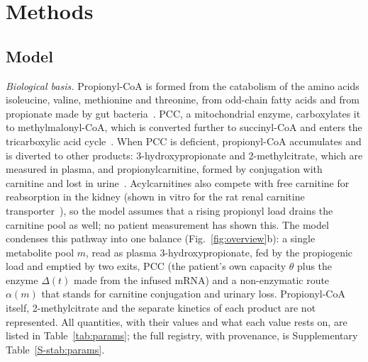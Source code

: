 \documentclass[11pt]{article}
\begin{document}
\section*{Methods}

\subsection*{Model}\label{sec:model}
\emph{Biological basis.} Propionyl-CoA is formed from the catabolism of the amino
acids isoleucine, valine, methionine and threonine, from odd-chain fatty acids and from propionate
made by gut bacteria~\cite{propionate_sources,pa_guidelines}. PCC, a mitochondrial enzyme,
carboxylates it to methylmalonyl-CoA, which is converted further to succinyl-CoA and enters the
tricarboxylic acid cycle~\cite{pa_guidelines}. When PCC is deficient, propionyl-CoA accumulates
and is diverted to other products: 3-hydroxypropionate and 2-methylcitrate, which are measured in
plasma, and propionylcarnitine, formed by conjugation with carnitine and lost in
urine~\cite{pa_guidelines,carnitine_excretion_pa}. Acylcarnitines also compete with free carnitine
for reabsorption in the kidney (shown in vitro for the rat renal carnitine
transporter~\cite{octn2_renal_transport}), so the model assumes that a rising propionyl load drains the carnitine pool as
well; no patient measurement has shown this. The model condenses this pathway into one balance (Fig.~\ref{fig:overview}b): a single
metabolite pool $m$, read as plasma 3-hydroxypropionate, fed by the propiogenic load and emptied
by two exits, PCC (the patient's own capacity $\theta$ plus the enzyme $\Delta(t)$ made from the
infused mRNA) and a non-enzymatic route $\alpha(m)$ that stands for carnitine conjugation and
urinary loss. Propionyl-CoA itself, 2-methylcitrate and the separate kinetics of each product are
not represented. All quantities, with their values and what each value rests on, are listed in
Table~\ref{tab:params}; the full registry, with provenance, is Supplementary
Table~\ref{S-stab:params}.
\end{document}
